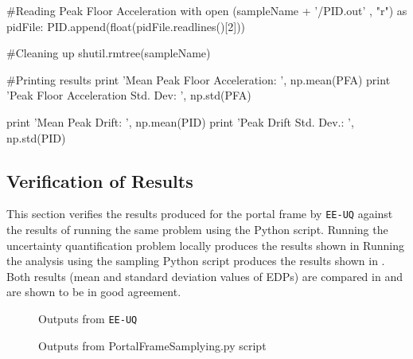 \begin{python}[caption=Python script for analyzing the portal frame model with uncertain parameters]
        #Reading Peak Floor Acceleration
        with open (sampleName + '/PID.out' , "r") as pidFile:
            PID.append(float(pidFile.readlines()[2]))

        #Cleaning up
        shutil.rmtree(sampleName)

#Printing results
print 'Mean Peak Floor Acceleration: ', np.mean(PFA)
print 'Peak Floor Acceleration Std. Dev: ', np.std(PFA)

print 'Mean Peak Drift: ', np.mean(PID)
print 'Peak Drift Std. Dev.: ', np.std(PID)
\end{python}

\subsection{Verification of Results}
This section verifies the results produced for the portal frame
by \texttt{EE-UQ} against the results of running the same
problem using the Python script.  Running the uncertainty
quantification problem locally produces the results
shown in  Running the analysis using the
sampling Python script produces the results shown
in .  Both results (mean and standard deviation
values of EDPs) are compared in  and are shown to be in good
agreement.

\begin{figure}[!htbp]
  \caption{Outputs from \texttt{EE-UQ}}
  \label{fig:figure28}
\end{figure}


\begin{figure}[!htbp]
  \caption{Outputs from PortalFrameSamplying.py script}
  \label{fig:figure29}
\end{figure}

